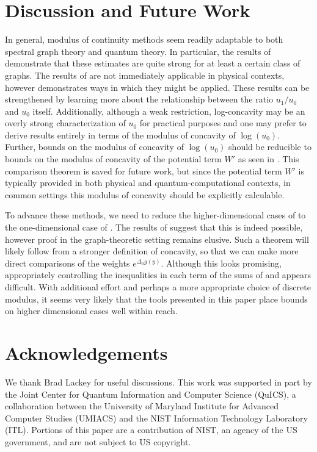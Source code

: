 \section{Discussion and Future Work}
In general, modulus of continuity methods seem readily adaptable to both spectral graph theory and quantum theory. In particular, the results of  demonstrate that these estimates are quite strong for at least a certain class of graphs. The results of  are not immediately applicable in physical contexts, however  demonstrates ways in which they might be applied. These results can be strengthened by learning more about the relationship between the ratio $u_1/u_0$ and $u_0$ itself. Additionally, although a weak restriction, log-concavity may be an overly strong characterization of $u_0$ for practical purposes and one may prefer to derive results entirely in terms of the modulus of concavity of $\log(u_0)$. Further, bounds on the modulus of concavity of $\log(u_0)$ should be reducible to bounds on the modulus of concavity of the potential term $W'$ as seen in \cite{Andrews2011}. This comparison theorem is saved for future work, but since the potential term $W'$ is typically provided in both physical and quantum-computational contexts, in common settings this modulus of concavity should be explicitly calculable.

To advance these methods, we need to reduce the higher-dimensional cases of  to the one-dimensional case of . The results of \citep{Andrews2011} suggest that this is indeed possible, however proof in the graph-theoretic setting remains elusive. Such a theorem will likely follow from a stronger definition of concavity, so that we can make more direct comparisons of the weights $e^{\Delta_a g(y)}$. Although this looks promising, appropriately controlling the inequalities in each term of the sums of  and  appears difficult. With additional effort and perhaps a more appropriate choice of discrete modulus, it seems very likely that the tools presented in this paper place bounds on higher dimensional cases well within reach.
	
\section{Acknowledgements}
We thank Brad Lackey for useful discussions. This work was supported in part by the Joint Center for Quantum Information and Computer Science (QuICS), a collaboration between the University of Maryland Institute for Advanced Computer Studies (UMIACS) and the NIST Information Technology Laboratory (ITL). Portions of this paper are a contribution of NIST, an agency of the US government, and are not subject to US copyright.